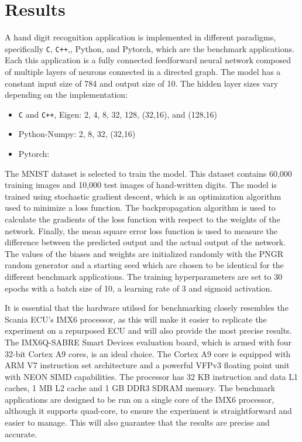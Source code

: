 \chapter{Results}
A hand digit recognition application is implemented in different paradigms, specifically \verb!C!, \verb!C++!,, Python, and Pytorch, which are the benchmark applications. Each this application is a fully connected feedforward neural network composed of multiple layers of neurons connected in a directed graph. The model has a constant input size of 784 and output size of 10. The hidden layer sizes vary depending on the implementation:

\begin{itemize}
	\item \verb!C! and \verb!C++!, Eigen: 2, 4, 8, 32, 128, (32,16), and (128,16)
	\item Python-Numpy: 2, 8, 32, (32,16)
	\item Pytorch:
\end{itemize}

The MNIST dataset is selected to train the model. This dataset contains 60,000 training images and 10,000 test images of hand-written digits. The model is trained using stochastic gradient descent, which is an optimization algorithm used to minimize a loss function. The backpropagation algorithm is used to calculate the gradients of the loss function with respect to the weights of the network. Finally, the mean square error loss function is used to measure the difference between the predicted output and the actual output of the network. The values of the biases and weights are initialized randomly with the PNGR random generator and a starting seed which are chosen to be identical for the different benchmark applications. The training hyperparameters are set to 30 epochs with a batch size of 10, a learning rate of 3 and sigmoid activation.

It is essential that the hardware utilsed for benchmarking closely resembles the Scania ECU's IMX6 processor, as this will make it easier to replicate the experiment on a repurposed ECU and will also provide the most precise results. The IMX6Q-SABRE Smart Devices evaluation board, which is armed with four 32-bit Cortex A9 cores, is an ideal choice. The Cortex A9 core is equipped with ARM V7 instruction set architecture and a powerful VFPv3 floating point unit with NEON SIMD capabilities. The processor has 32 KB instruction and data L1 caches, 1 MB L2 cache and 1 GB DDR3 SDRAM memory. The benchmark applications are designed to be run on a single core of the IMX6 processor, although it supports quad-core, to ensure the experiment is straightforward and easier to manage. This will also guarantee that the results are precise and accurate.

